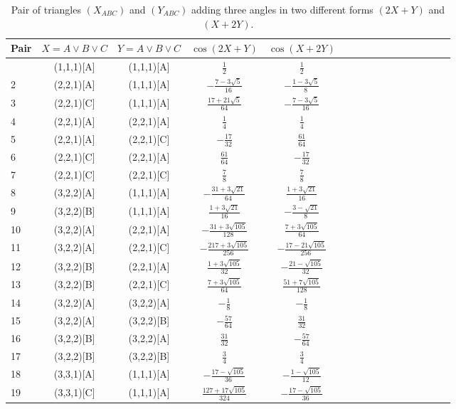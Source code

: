 \documentclass[11pt]{article}
\begin{document}
\begin{longtable}{ | p{1cm}| *{15}{c|} }
\caption{Pair of triangles $(X_{ABC})$ and $(Y_{ABC})$ adding three angles 
in two different forms $(2X+Y)$ and $(X+2Y)$.}\\
\hline
Pair & $X = A \lor B \lor C$ & $Y = A \lor B \lor C$ & $\cos(2X+Y)$ & $\cos(X+2Y)$ \\
\hline\endhead
\hline\endfoot
1 & (1,1,1)[A] & (1,1,1)[A] & $\frac{1}{2}$ & $\frac{1}{2}$\\
2 & (2,2,1)[A] & (1,1,1)[A] & $-\frac{7-3\sqrt{5}}{16}$ & $-\frac{1-3\sqrt{5}}{8}$\\
3 & (2,2,1)[C] & (1,1,1)[A] & $\frac{17+21\sqrt{5}}{64}$ & $-\frac{7-3\sqrt{5}}{16}$\\
4 & (2,2,1)[A] & (2,2,1)[A] & $\frac{1}{4}$ & $\frac{1}{4}$\\
5 & (2,2,1)[A] & (2,2,1)[C] & $-\frac{17}{32}$ & $\frac{61}{64}$\\
6 & (2,2,1)[C] & (2,2,1)[A] & $\frac{61}{64}$ & $-\frac{17}{32}$\\
7 & (2,2,1)[C] & (2,2,1)[C] & $\frac{7}{8}$ & $\frac{7}{8}$\\
8 & (3,2,2)[A] & (1,1,1)[A] & $-\frac{31+3\sqrt{21}}{64}$ & $\frac{1+3\sqrt{21}}{16}$\\
9 & (3,2,2)[B] & (1,1,1)[A] & $\frac{1+3\sqrt{21}}{16}$ & $-\frac{3-\sqrt{21}}{8}$\\
10 & (3,2,2)[A] & (2,2,1)[A] & $-\frac{31+3\sqrt{105}}{128}$ & $\frac{7+3\sqrt{105}}{64}$\\
11 & (3,2,2)[A] & (2,2,1)[C] & $-\frac{217+3\sqrt{105}}{256}$ & $-\frac{17-21\sqrt{105}}{256}$\\
12 & (3,2,2)[B] & (2,2,1)[A] & $\frac{1+3\sqrt{105}}{32}$ & $-\frac{21-\sqrt{105}}{32}$\\
13 & (3,2,2)[B] & (2,2,1)[C] & $\frac{7+3\sqrt{105}}{64}$ & $\frac{51+7\sqrt{105}}{128}$\\
14 & (3,2,2)[A] & (3,2,2)[A] & $-\frac{1}{8}$ & $-\frac{1}{8}$\\
15 & (3,2,2)[A] & (3,2,2)[B] & $-\frac{57}{64}$ & $\frac{31}{32}$\\
16 & (3,2,2)[B] & (3,2,2)[A] & $\frac{31}{32}$ & $-\frac{57}{64}$\\
17 & (3,2,2)[B] & (3,2,2)[B] & $\frac{3}{4}$ & $\frac{3}{4}$\\
18 & (3,3,1)[A] & (1,1,1)[A] & $-\frac{17-\sqrt{105}}{36}$ & $-\frac{1-\sqrt{105}}{12}$\\
19 & (3,3,1)[C] & (1,1,1)[A] & $\frac{127+17\sqrt{105}}{324}$ & $-\frac{17-\sqrt{105}}{36}$\\

\end{longtable}
\end{document}

